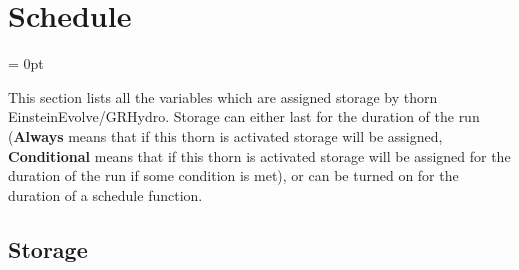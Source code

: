 
\section{Schedule} 


\parskip = 0pt


\noindent This section lists all the variables which are assigned storage by thorn EinsteinEvolve/GRHydro.  Storage can either last for the duration of the run ({\bf Always} means that if this thorn is activated storage will be assigned, {\bf Conditional} means that if this thorn is activated storage will be assigned for the duration of the run if some condition is met), or can be turned on for the duration of a schedule function.


\subsection*{Storage}

\hspace{5mm}

